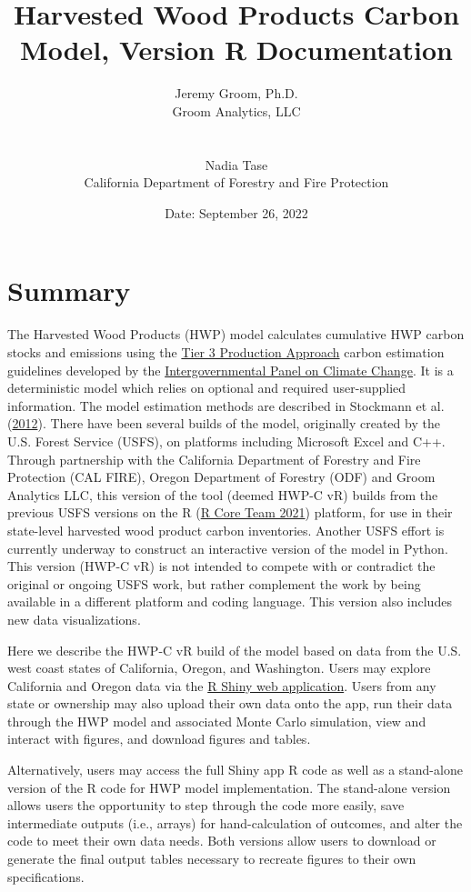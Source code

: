 \documentclass[
  openany]{book}
\title{Harvested Wood Products Carbon Model, Version R Documentation}
\author{Jeremy Groom, Ph.D.\\
Groom Analytics, LLC\\
\strut \\
Nadia Tase\\
California Department of Forestry and Fire Protection}
\date{Date: September 26, 2022}
\begin{document}
\frontmatter
\maketitle

\mainmatter
\hypertarget{sum}{%
\chapter{Summary}\label{sum}}

The Harvested Wood Products (HWP) model calculates cumulative HWP carbon
stocks and emissions using the
\href{https://www.ipcc-nggip.iges.or.jp/public/2006gl/pdf/4_Volume4/V4_04_Ch4_Forest_Land.pdf}{Tier
3 Production Approach} carbon estimation guidelines developed by the
\href{https://www.ipcc.ch/}{Intergovernmental Panel on Climate Change}.
It is a deterministic model which relies on optional and required
user-supplied information. The model estimation methods are described in
Stockmann et al. (\protect\hyperlink{ref-stockmann2012}{2012}). There
have been several builds of the model, originally created by the U.S.
Forest Service (USFS), on platforms including Microsoft Excel and C++.
Through partnership with the California Department of Forestry and Fire
Protection (CAL FIRE), Oregon Department of Forestry (ODF) and Groom
Analytics LLC, this version of the tool (deemed HWP-C vR) builds from
the previous USFS versions on the R (\protect\hyperlink{ref-R-base}{R
Core Team 2021}) platform, for use in their state-level harvested wood
product carbon inventories. Another USFS effort is currently underway to
construct an interactive version of the model in Python. This version
(HWP-C vR) is not intended to compete with or contradict the original or
ongoing USFS work, but rather complement the work by being available in
a different platform and coding language. This version also includes new
data visualizations.

Here we describe the HWP-C vR build of the model based on data from the
U.S. west coast states of California, Oregon, and Washington. Users may
explore California and Oregon data via the
\href{https://groomanalyticsllc.shinyapps.io/HWP-C-vR/}{R Shiny web
application}. Users from any state or ownership may also upload their
own data onto the app, run their data through the HWP model and
associated Monte Carlo simulation, view and interact with figures, and
download figures and tables.

Alternatively, users may access the full Shiny app R code as well as a
stand-alone version of the R code for HWP model implementation. The
stand-alone version allows users the opportunity to step through the
code more easily, save intermediate outputs (i.e., arrays) for
hand-calculation of outcomes, and alter the code to meet their own data
needs. Both versions allow users to download or generate the final
output tables necessary to recreate figures to their own specifications.
\end{document}
